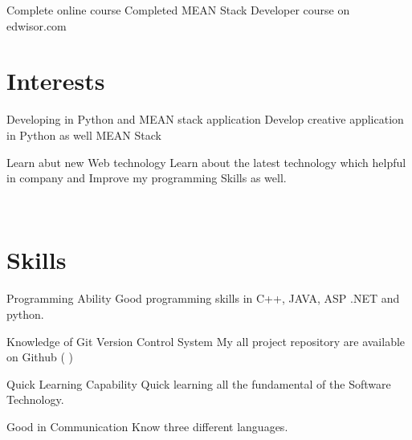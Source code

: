 \documentclass[print]{cv-style}          %
\begin{document}
\begin{entrylist}
\entry
{}
{Complete online course }
{}
{Completed MEAN Stack Developer course on edwisor.com }

\end{entrylist}




\vspace{0.1cm}
\section{Interests}
  
\begin{entrylist}
\entry
{}
{Developing in Python and MEAN stack application}
{}
{Develop creative application in Python as well MEAN Stack}

\entry
  {}
  {Learn abut new Web technology }
  {}
  {\jobtitle{}Learn about the latest technology which helpful in company and Improve my
     programming Skills as well.}


\end{entrylist}\

  

\section{Skills}
  \vspace{-0.2cm}

\begin{entrylist}

\entry
  {}
  {Programming Ability }
  {}
  {\jobtitle{}Good programming skills in C++, JAVA, ASP .NET and python. }
  
  \entry
  {}
  {Knowledge of Git Version Control System }
  {}
  {\jobtitle{}My all project repository are available on Github 
   (  )}
  
  \entry
  {}
  {Quick Learning Capability}
  {}
  {\jobtitle{}Quick learning all the fundamental of the Software Technology. }
  
  \entry
  {}
  {Good in Communication }
  {}
  {\jobtitle{}Know three different languages. }
  

\end{entrylist}


\end{document}

